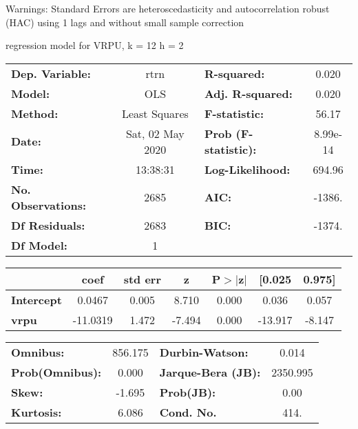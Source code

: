 Warnings: \newline
 [1] Standard Errors are heteroscedasticity and autocorrelation robust (HAC) using 1 lags and without small sample correction\ 

regression model for VRPU, k = 12 h = 2\begin{center}
\begin{tabular}{lclc}
\toprule
\textbf{Dep. Variable:}    &       rtrn       & \textbf{  R-squared:         } &     0.020   \\
\textbf{Model:}            &       OLS        & \textbf{  Adj. R-squared:    } &     0.020   \\
\textbf{Method:}           &  Least Squares   & \textbf{  F-statistic:       } &     56.17   \\
\textbf{Date:}             & Sat, 02 May 2020 & \textbf{  Prob (F-statistic):} &  8.99e-14   \\
\textbf{Time:}             &     13:38:31     & \textbf{  Log-Likelihood:    } &    694.96   \\
\textbf{No. Observations:} &        2685      & \textbf{  AIC:               } &    -1386.   \\
\textbf{Df Residuals:}     &        2683      & \textbf{  BIC:               } &    -1374.   \\
\textbf{Df Model:}         &           1      & \textbf{                     } &             \\
\bottomrule
\end{tabular}
\begin{tabular}{lcccccc}
                   & \textbf{coef} & \textbf{std err} & \textbf{z} & \textbf{P$> |$z$|$} & \textbf{[0.025} & \textbf{0.975]}  \\
\midrule
\textbf{Intercept} &       0.0467  &        0.005     &     8.710  &         0.000        &        0.036    &        0.057     \\
\textbf{vrpu}      &     -11.0319  &        1.472     &    -7.494  &         0.000        &      -13.917    &       -8.147     \\
\bottomrule
\end{tabular}
\begin{tabular}{lclc}
\textbf{Omnibus:}       & 856.175 & \textbf{  Durbin-Watson:     } &    0.014  \\
\textbf{Prob(Omnibus):} &   0.000 & \textbf{  Jarque-Bera (JB):  } & 2350.995  \\
\textbf{Skew:}          &  -1.695 & \textbf{  Prob(JB):          } &     0.00  \\
\textbf{Kurtosis:}      &   6.086 & \textbf{  Cond. No.          } &     414.  \\
\bottomrule
\end{tabular}
\end{center}

